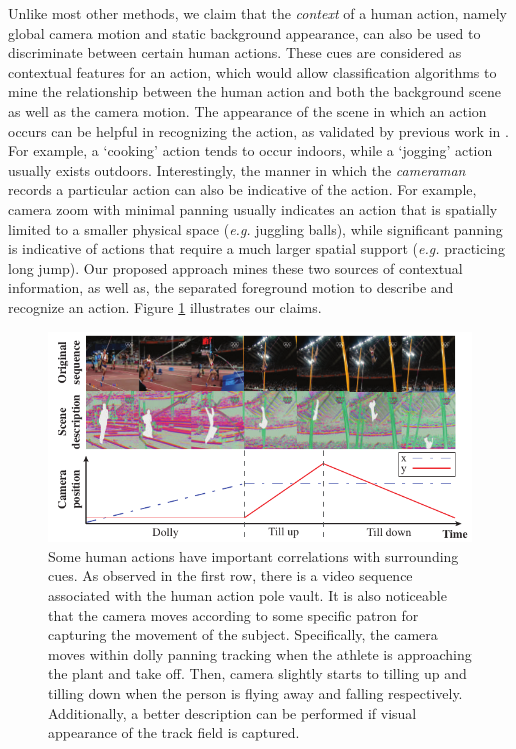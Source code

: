 \documentclass[runningheads]{llncs}
\begin{document}
Unlike most other methods, we claim that the \emph{context} of a human action, namely global camera motion and static background appearance, can also be used to discriminate between certain human actions. These cues are considered as contextual features for an action, which would allow classification algorithms to mine the relationship between the human action and both the background scene as well as the camera motion. The appearance of the scene in which an action occurs can be helpful in recognizing the action, as validated by previous work in \cite{marszalek2009}. For example, a `cooking' action tends to occur indoors, while a `jogging' action usually exists outdoors. Interestingly, the manner in which the \emph{cameraman} records a particular action can also be indicative of the action. For example, camera zoom with minimal panning usually indicates an action that is spatially limited to a smaller physical space (\emph{e.g.} juggling balls), while significant panning is indicative of actions that require a much larger spatial support (\emph{e.g.} practicing long jump). Our proposed approach mines these two sources of contextual information, as well as, the separated foreground motion to describe and recognize an action. Figure \ref{fig:pull_figure} illustrates our claims.

\begin{figure}[ht]
\begin{center}
\includegraphics[width=0.98\linewidth]{pull_figure.pdf}
\end{center}
\vspace{-6pt}\caption{Some human actions have important correlations with surrounding cues. As observed in the first row, there is a video sequence associated with the human action pole vault. It is also noticeable that the camera moves according to some specific patron for capturing the movement of the subject. Specifically, the camera moves within dolly panning tracking when the athlete is approaching the plant and take off. Then, camera slightly starts to tilling up and tilling down when the person is flying away and falling respectively. Additionally, a better description can be performed if visual appearance of the track field is captured.}
\label{fig:pull_figure}
\end{figure}
\end{document}
